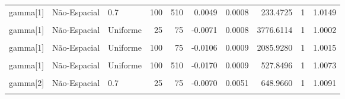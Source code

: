 \documentclass[
]{article}
\begin{document}
\begin{longtable}[t]{lllrrrrrrr}
\cmidrule{1-10}\pagebreak[0]
gamma[1] & Não-Espacial & 0.7 & 100 & 510 & 0.0049 & 0.0008 & 233.4725 & 1 & 1.0149\\
\cmidrule{1-10}\pagebreak[0]
\cellcolor{gray!10}{gamma[1]} & \cellcolor{gray!10}{Espacial} & \cellcolor{gray!10}{Uniforme} & \cellcolor{gray!10}{25} & \cellcolor{gray!10}{75} & \cellcolor{gray!10}{-0.0052} & \cellcolor{gray!10}{0.0008} & \cellcolor{gray!10}{3507.9204} & \cellcolor{gray!10}{1} & \cellcolor{gray!10}{1.0024}\\
\cmidrule{1-10}\pagebreak[0]
gamma[1] & Não-Espacial & Uniforme & 25 & 75 & -0.0071 & 0.0008 & 3776.6114 & 1 & 1.0002\\
\cmidrule{1-10}\pagebreak[0]
\cellcolor{gray!10}{gamma[1]} & \cellcolor{gray!10}{Espacial} & \cellcolor{gray!10}{Uniforme} & \cellcolor{gray!10}{100} & \cellcolor{gray!10}{75} & \cellcolor{gray!10}{-0.0113} & \cellcolor{gray!10}{0.0009} & \cellcolor{gray!10}{1217.3544} & \cellcolor{gray!10}{1} & \cellcolor{gray!10}{1.0000}\\
\cmidrule{1-10}\pagebreak[0]
gamma[1] & Não-Espacial & Uniforme & 100 & 75 & -0.0106 & 0.0009 & 2085.9280 & 1 & 1.0015\\
\cmidrule{1-10}\pagebreak[0]
\cellcolor{gray!10}{gamma[1]} & \cellcolor{gray!10}{Espacial} & \cellcolor{gray!10}{Uniforme} & \cellcolor{gray!10}{100} & \cellcolor{gray!10}{510} & \cellcolor{gray!10}{-0.0106} & \cellcolor{gray!10}{0.0008} & \cellcolor{gray!10}{704.0179} & \cellcolor{gray!10}{1} & \cellcolor{gray!10}{1.0011}\\
\cmidrule{1-10}\pagebreak[0]
gamma[1] & Não-Espacial & Uniforme & 100 & 510 & -0.0170 & 0.0009 & 527.8496 & 1 & 1.0073\\
\cmidrule{1-10}\pagebreak[0]
\cellcolor{gray!10}{gamma[2]} & \cellcolor{gray!10}{Espacial} & \cellcolor{gray!10}{0.7} & \cellcolor{gray!10}{25} & \cellcolor{gray!10}{75} & \cellcolor{gray!10}{0.0710} & \cellcolor{gray!10}{0.0195} & \cellcolor{gray!10}{289.5127} & \cellcolor{gray!10}{1} & \cellcolor{gray!10}{1.4004}\\
\cmidrule{1-10}\pagebreak[0]
gamma[2] & Não-Espacial & 0.7 & 25 & 75 & -0.0070 & 0.0051 & 648.9660 & 1 & 1.0091\\
\cmidrule{1-10}\pagebreak[0]
\cellcolor{gray!10}{gamma[2]} & \cellcolor{gray!10}{Espacial} & \cellcolor{gray!10}{0.7} & \cellcolor{gray!10}{25} & \cellcolor{gray!10}{510} & \cellcolor{gray!10}{0.3522} & \cellcolor{gray!10}{0.1287} & \cellcolor{gray!10}{121.9921} & \cellcolor{gray!10}{0} & \cellcolor{gray!10}{1.0249}\\

\end{longtable}
\end{document}
